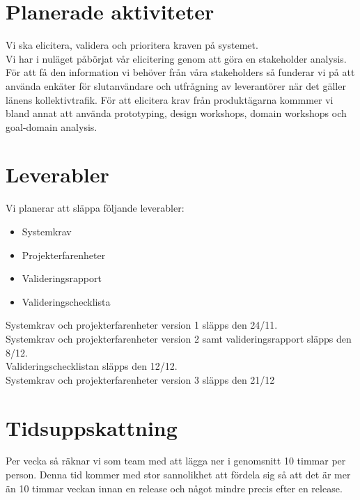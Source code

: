 \documentclass[a4paper]{article}
\begin{document}
	\section{Planerade aktiviteter}
		Vi ska elicitera, validera och prioritera kraven på systemet.\\
		
		Vi har i nuläget påbörjat vår elicitering genom att göra en stakeholder analysis.
		För att få den information vi behöver från våra stakeholders så funderar vi på att använda enkäter för slutanvändare och utfrågning av leverantörer när det gäller länens kollektivtrafik. För att elicitera krav från produktägarna kommmer vi bland annat att använda prototyping, design workshops, domain workshops och goal-domain analysis.

	\section{Leverabler} %
	\label{sec:deliverables}
		Vi planerar att släppa följande leverabler:
		\begin{itemize}
			\item Systemkrav
			\item Projekterfarenheter
			\item Valideringsrapport
			\item Valideringschecklista
		\end{itemize}
		Systemkrav och projekterfarenheter version 1 släpps den 24/11.\\
		Systemkrav och projekterfarenheter version 2 samt valideringsrapport släpps den 8/12.\\
		Valideringschecklistan släpps den 12/12.\\
		Systemkrav och projekterfarenheter version 3 släpps den 21/12\\ 		

	\section{Tidsuppskattning}
		Per vecka så räknar vi som team med att lägga ner i genomsnitt 10 timmar per person. Denna tid kommer med stor sannolikhet att fördela sig så att det är mer än 10 timmar veckan innan en release och något mindre precis efter en release. 	
\end{document}

